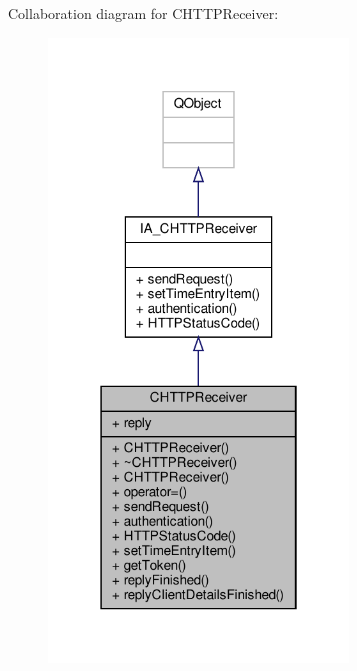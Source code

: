 Collaboration diagram for C\+H\+T\+T\+P\+Receiver\+:
\nopagebreak
\begin{figure}[H]
\begin{center}
\leavevmode
\includegraphics[width=226pt]{classCHTTPReceiver__coll__graph}
\end{center}
\end{figure}
